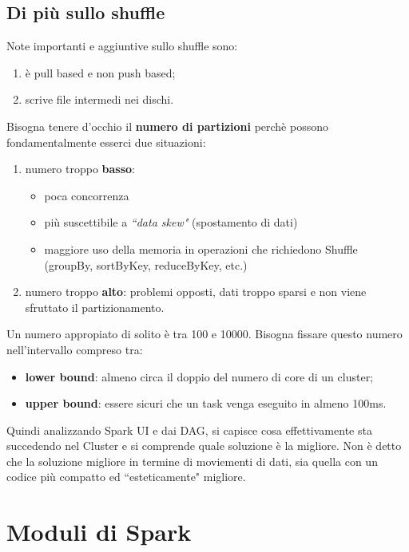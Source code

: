 \documentclass[12pt,italian]{article}
\begin{document}
\subsection{Di più sullo shuffle}
Note importanti e aggiuntive sullo shuffle sono:
\begin{enumerate}
	\item è pull based e non push based;
	\item scrive file intermedi nei dischi.
\end{enumerate}
Bisogna tenere d'occhio il \textbf{numero di partizioni} perchè possono fondamentalmente esserci due situazioni:
\begin{enumerate}
	\item numero troppo \textbf{basso}:
	\begin{itemize}
		\item poca concorrenza
		\item più suscettibile a \textit{``data skew"} (spostamento di dati)
		\item maggiore uso della memoria in operazioni che richiedono Shuffle (groupBy, sortByKey, reduceByKey, etc.)
	\end{itemize}
	\item numero troppo \textbf{alto}: problemi opposti, dati troppo sparsi e non viene sfruttato il partizionamento.
\end{enumerate}
Un numero appropiato di solito è tra 100 e 10000.
Bisogna fissare questo numero nell'intervallo compreso tra:
\begin{itemize}
	\item \textbf{lower bound}:  almeno circa il doppio del numero di core di un cluster;
	\item \textbf{upper bound}: essere sicuri che un task venga eseguito in almeno 100ms.
\end{itemize}
Quindi analizzando Spark UI e dai DAG, si capisce cosa effettivamente sta succedendo nel Cluster e si comprende quale soluzione è la migliore. Non è detto che la soluzione migliore in termine di moviementi di dati, sia quella con un codice più compatto ed ``esteticamente" migliore.
\section{Moduli di Spark}
\end{document}
